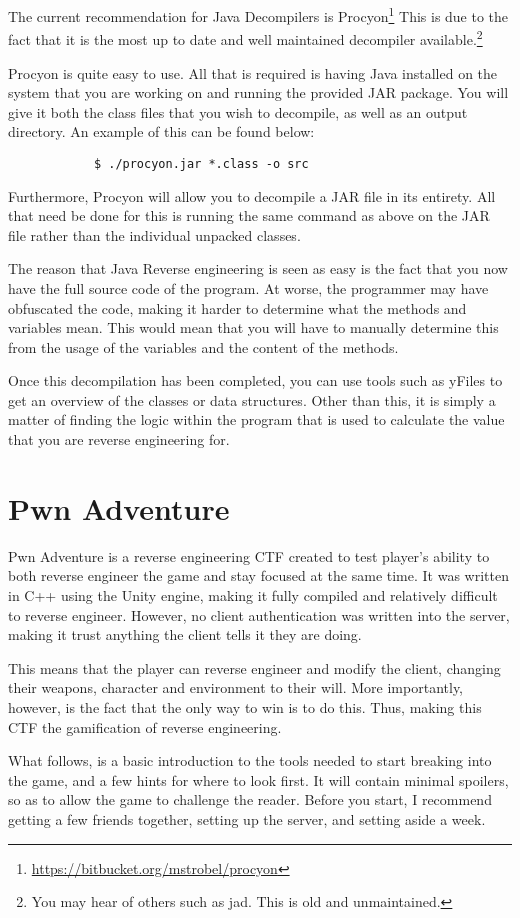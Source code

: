 		The current recommendation for Java Decompilers is Procyon\footnote{\url{https://bitbucket.org/mstrobel/procyon}}
		This is due to the fact that it is the most up to date and well maintained decompiler available.\footnote{You may hear of others such as jad. This is old and unmaintained.}

		Procyon is quite easy to use.
		All that is required is having Java installed on the system that you are working on and running the provided JAR package.
		You will give it both the class files that you wish to decompile, as well as an output directory.
		An example of this can be found below:
		\begin{verbatim}
			$ ./procyon.jar *.class -o src
		\end{verbatim}

		Furthermore, Procyon will allow you to decompile a JAR file in its entirety.
		All that need be done for this is running the same command as above on the JAR file rather than the individual unpacked classes.

		The reason that Java Reverse engineering is seen as easy is the fact that you now have the full source code of the program.
		At worse, the programmer may have obfuscated the code, making it harder to determine what the methods and variables mean.
		This would mean that you will have to manually determine this from the usage of the variables and the content of the methods.

		Once this decompilation has been completed, you can use tools such as yFiles to get an overview of the classes or data structures.
		Other than this, it is simply a matter of finding the logic within the program that is used to calculate the value that you are reverse engineering for.

	\section{Pwn Adventure}
		Pwn Adventure is a reverse engineering CTF created to test player's ability to both reverse engineer the game and stay focused at the same time.
		It was written in C++ using the Unity engine, making it fully compiled and relatively difficult to reverse engineer.
		However, no client authentication was written into the server, making it trust anything the client tells it they are doing.

		This means that the player can reverse engineer and modify the client, changing their weapons, character and environment to their will.
		More importantly, however, is the fact that the only way to win is to do this.
		Thus, making this CTF the gamification of reverse engineering.

		What follows, is a basic introduction to the tools needed to start breaking into the game, and a few hints for where to look first.
		It will contain minimal spoilers, so as to allow the game to challenge the reader.
		Before you start, I recommend getting a few friends together, setting up the server, and setting aside a week.
